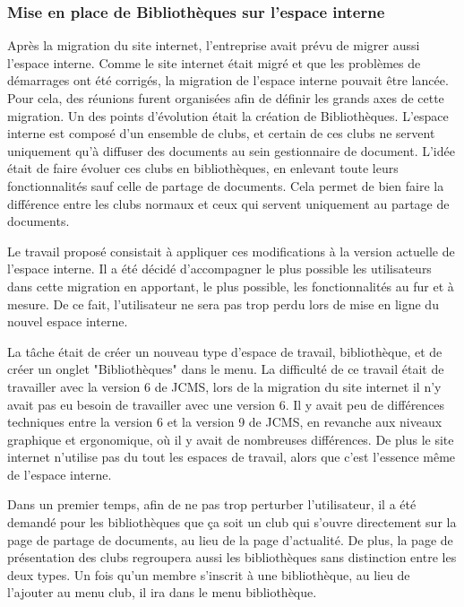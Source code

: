 \documentclass[12pt,a4paper]{article}
\begin{document}
\subsubsection{Mise en place de Bibliothèques sur l'espace interne}
Après la migration du site internet, l'entreprise avait prévu de migrer aussi l'espace interne. Comme le site internet était migré et que les problèmes de démarrages ont été corrigés, la migration de l'espace interne pouvait être lancée. Pour cela, des réunions furent organisées afin de définir les grands axes de cette migration. Un des points d'évolution était la création de Bibliothèques. L'espace interne est composé d'un ensemble de clubs, et certain de ces clubs ne servent uniquement qu'à diffuser des documents au sein gestionnaire de document. L'idée était de faire évoluer ces clubs en bibliothèques, en enlevant toute leurs fonctionnalités sauf celle de partage de documents. Cela permet de bien faire la différence entre les clubs normaux et ceux qui servent uniquement au partage de documents.\par 
Le travail proposé consistait à appliquer ces modifications à la version actuelle de l'espace interne. Il a été décidé d'accompagner le plus possible les utilisateurs dans cette migration en apportant, le plus possible, les fonctionnalités au fur et à mesure. De ce fait, l'utilisateur ne sera pas trop perdu lors de mise en ligne du nouvel espace interne.\par 
La tâche était de créer un nouveau type d'espace de travail, bibliothèque, et de créer un onglet "Bibliothèques" dans le menu. La difficulté de ce travail était de travailler avec la version 6 de \gls{JCMS}, lors de la migration du site internet il n'y avait pas eu besoin de travailler avec une version 6. Il y avait peu de différences techniques entre la version 6 et la version 9 de \gls{JCMS}, en revanche aux niveaux graphique et ergonomique, où il y avait de nombreuses différences. De plus le site internet n'utilise pas du tout les espaces de travail, alors que c'est l'essence même de l'espace interne.\par 
Dans un premier temps, afin de ne pas trop perturber l'utilisateur, il a été demandé pour les bibliothèques que ça soit un club qui s'ouvre directement sur la page de partage de documents, au lieu de la page d'actualité. De plus, la page de présentation des clubs regroupera aussi les bibliothèques sans distinction entre les deux types. Un fois qu'un membre s'inscrit à une bibliothèque, au lieu de l'ajouter au menu club, il ira dans le menu bibliothèque.\par
\end{document}
